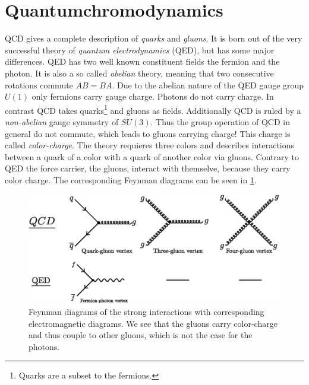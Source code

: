 \documentclass[../../index.tex]{subfiles}
\begin{document}
\section{Quantumchromodynamics}
\label{sec:quantumchromodynamics}
QCD gives a complete description of \textit{quarks} and \textit{gluons}. It is
born out of the very successful theory of \textit{quantum electrodynamics}
(QED), but has some major differences. QED has two well known constituent
fields the fermion and the photon. It is also a so called \textit{abelian}
theory, meaning that two consecutive rotations commute $AB = BA$. Due to the
abelian nature of the QED gauge group $U(1)$ only fermions carry gauge charge. Photons
do not carry charge. In contrast QCD takes quarks\footnote{Quarks are a subset
  to the fermions.} and gluons as fields. Additionally QCD is ruled by a \textit{non-abelian}
gauge symmetry of $SU(3)$. Thus the group operation of QCD in general do not
commute, which leads to gluons carrying charge! This charge is called
\textit{color-charge}. The theory requieres three colors and describes
interactions between a quark of a color with a quark of another color via
gluons. Contrary to QED the force carrier, the gluons, interact with themselve,
because they carry color charge. The corresponding Feynman diagrams can be seen
in \cref{fig:qcdFeynmanDiagrams}.
\begin{figure}
  \centering
  \includegraphics[width=\textwidth]{./images/qcdFeynmanDiagrams.eps}
  \caption{Feynman diagrams of the strong interactions with corresponding
    electromagnetic diagrams. We see that the gluons carry color-charge and thus
    couple to other gluons, which is not the case for the photons.}
  \label{fig:qcdFeynmanDiagrams}
\end{figure}
\end{document}
